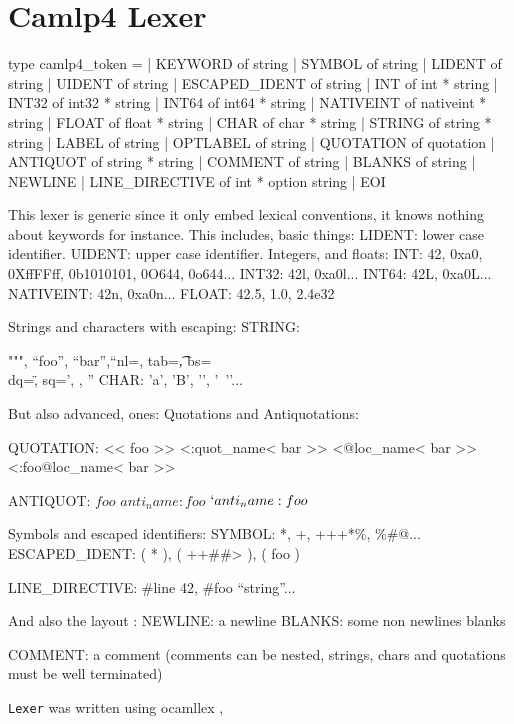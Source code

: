 \section{Camlp4 Lexer}

\begin{ocamlcode}
type camlp4_token =
 | KEYWORD       of string
 | SYMBOL        of string
 | LIDENT        of string
 | UIDENT        of string
 | ESCAPED_IDENT of string
 | INT           of int * string
 | INT32         of int32 * string
 | INT64         of int64 * string
 | NATIVEINT     of nativeint * string
 | FLOAT         of float * string
 | CHAR          of char * string
 | STRING        of string * string
 | LABEL         of string
 | OPTLABEL      of string
 | QUOTATION     of quotation
 | ANTIQUOT      of string * string
 | COMMENT       of string
 | BLANKS        of string
 | NEWLINE
 | LINE_DIRECTIVE of int * option string
 | EOI
\end{ocamlcode}

This lexer is generic since it only embed lexical conventions, it
knows nothing about keywords for instance.  This includes, basic
things: LIDENT: lower case identifier.  UIDENT: upper case identifier.
Integers, and floats: INT: 42, 0xa0, 0XffFFff, 0b1010101, 0O644,
0o644...  INT32: 42l, 0xa0l...  INT64: 42L, 0xa0L...  NATIVEINT: 42n,
0xa0n...  FLOAT: 42.5, 1.0, 2.4e32

Strings and characters with escaping: STRING:

 """, ``foo'', ``bar\n'',``nl=\n, tab=\t, bs=\\ dq=\", sq=', ,
'' 
 CHAR: 'a', 'B', '\n', '\, '\n'...  

But also advanced, ones: Quotations and Antiquotations: 

QUOTATION: 
<< foo >> 
<:quot_name< bar >> 
<@loc_name< bar >> 
<:foo@loc_name< bar >>

ANTIQUOT: 
$foo$ 
$anti_name:foo$ 
$`anti_name:foo$

Symbols and escaped identifiers: 
SYMBOL: *, +, +++*\%, \%#@...  
ESCAPED_IDENT: ( * ), ( ++##> ), ( foo ) 

LINE_DIRECTIVE: 
#line 42, 
#foo ``string''...  

And also the layout :
NEWLINE: a newline 
BLANKS: some non newlines blanks


COMMENT: a comment (comments can be nested, strings,
chars and quotations must be well terminated)



\verb|Lexer| was written using ocamllex ,

